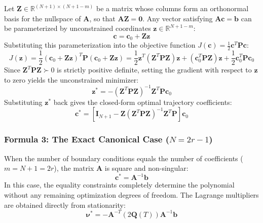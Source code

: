 \documentclass[11pt,a4paper]{article}
\begin{document}
Let $\mathbf{Z} \in \mathbb{R}^{(N+1) \times (N+1-m)}$ be a matrix whose columns form an orthonormal basis for the nullspace of $\mathbf{A}$, so that $\mathbf{A}\mathbf{Z} = \mathbf{0}$. Any vector satisfying $\mathbf{A}\mathbf{c} = \mathbf{b}$ can be parameterized by unconstrained coordinates $\mathbf{z} \in \mathbb{R}^{N+1-m}$:
\begin{equation}
\mathbf{c} = \mathbf{c}_0 + \mathbf{Z} \mathbf{z}
\end{equation}
Substituting this parameterization into the objective function $J(\mathbf{c}) = \frac{1}{2}\mathbf{c}^T \mathbf{P} \mathbf{c}$:
\begin{equation}
J(\mathbf{z}) = \frac{1}{2} (\mathbf{c}_0 + \mathbf{Z}\mathbf{z})^T \mathbf{P} (\mathbf{c}_0 + \mathbf{Z}\mathbf{z})
= \frac{1}{2} \mathbf{z}^T (\mathbf{Z}^T \mathbf{P} \mathbf{Z}) \mathbf{z} + (\mathbf{c}_0^T \mathbf{P} \mathbf{Z}) \mathbf{z} + \frac{1}{2} \mathbf{c}_0^T \mathbf{P} \mathbf{c}_0
\end{equation}
Since $\mathbf{Z}^T \mathbf{P} \mathbf{Z} \succ 0$ is strictly positive definite, setting the gradient with respect to $\mathbf{z}$ to zero yields the unconstrained minimizer:
\begin{equation}
\mathbf{z}^* = -(\mathbf{Z}^T \mathbf{P} \mathbf{Z})^{-1} \mathbf{Z}^T \mathbf{P} \mathbf{c}_0
\end{equation}
Substituting $\mathbf{z}^*$ back gives the closed-form optimal trajectory coefficients:
\begin{equation}
\label{eq:nullspace_c_star}
\mathbf{c}^* = \left[ \mathbf{I}_{N+1} - \mathbf{Z} (\mathbf{Z}^T \mathbf{P} \mathbf{Z})^{-1} \mathbf{Z}^T \mathbf{P} \right] \mathbf{c}_0
\end{equation}

\subsubsection{Formula 3: The Exact Canonical Case (\texorpdfstring{$N = 2r - 1$}{N = 2r - 1})}
When the number of boundary conditions equals the number of coefficients ($m = N + 1 = 2r$), the matrix $\mathbf{A}$ is square and non-singular:
\begin{equation}
\label{eq:exact_linear_solve}
\mathbf{c}^* = \mathbf{A}^{-1} \mathbf{b}
\end{equation}
In this case, the equality constraints completely determine the polynomial without any remaining optimization degrees of freedom. The Lagrange multipliers are obtained directly from stationarity:
\begin{equation}
\boldsymbol{\nu}^* = -\mathbf{A}^{-T} (2\mathbf{Q}(T)) \mathbf{A}^{-1} \mathbf{b}
\end{equation}
\end{document}
